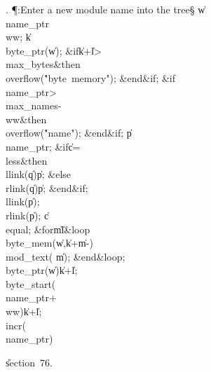 . \P\?:Enter a new module name into the tree\X\S\?\6
\|w\?\K\?\\{name\_ptr}\?\?\\{ww};\5
\|k\?\K\?\\{byte\_ptr}\?\1(\?\|w\?\2)\?;\6
\&{if}\1\1\8\|k\?+\?\|l\?>\?\\{max\_bytes}\2\8\&{then}\6
\\{overflow}\?\1(\?\.{"byte\ memory"}\?\2)\?;\2\6
\&{end}\8\2\&{if}\1;\6
\&{if}\1\1\8\\{name\_ptr}\?>\?\\{max\_names}\?-\?\\{ww}\2\8\&{then}\6
\\{overflow}\?\1(\?\.{"name"}\?\2)\?;\2\6
\&{end}\8\2\&{if}\1;\6
\|p\?\K\?\\{name\_ptr};\6
\&{if}\1\1\8\|c\?=\?\\{less}\2\8\&{then}\6
\\{llink}\?\1(\?\|q\?\2)\K\?\|p;\6
\4\&{else}\6
\\{rlink}\?\1(\?\|q\?\2)\K\?\|p;\2\6
\&{end}\8\2\&{if}\1;\6
\\{llink}\?\1(\?\|p\?\2)\K{};\5
\\{rlink}\?\1(\?\|p\?\2)\K{};\5
\|c\?\K\?\\{equal};\6
\1\&{for}\8\|m\?\in{}\?\to\?\|l\8\&{loop}\6
\\{byte\_mem}\?\1(\?\|w\?,\?\|k\?+\?\|m\?-\?\2)\K\?\\{mod\_text}\?\1(\?%
\|m\?\2)\?;\2\6
\&{end}\8\&{loop};\6
\\{byte\_ptr}\?\1(\?\|w\?\2)\K\?\|k\?+\?\|l;\5
\\{byte\_start}\?\1(\?\\{name\_ptr}\?+\?\\{ww}\?\2)\K\?\|k\?+\?\|l;\5
\\{incr}\?\1(\?\\{name\_ptr}\?\2)\?\par
\U section~76.\fi

